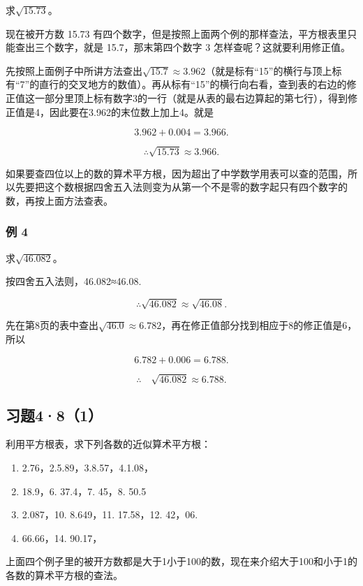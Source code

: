 求\(\sqrt{15.73}\)。

现在被开方数 15.73
有四个数字，但是按照上面两个例的那样查法，平方根表里只能查出三个数字，就是
15.7，那末第四个数字 3 怎样查呢？这就要利用修正值。

先按照上面例子中所讲方法查出\(\sqrt{15.7} \approx 3.962\)（就是标有``15''的横行与顶上标有``7''的直行的交叉地方的数值）。再从标有``15''的横行向右看，查到表的右边的修正值这一部分里顶上标有数字3的一行（就是从表的最右边算起的第七行），得到修正值是4，因此要在3.962的末位数上加上4。就是

\[
3.962 + 0.004 = 3.966.
\]

\[
\therefore \sqrt {15.73} \approx 3.966.
\]

如果要查四位以上的数的算术平方根，因为超出了中学数学用表可以查的范围，所以先要把这个数根据四舍五入法则变为从第一个不是零的数字起只有四个数字的数，再按上面方法查表。

\subsubsection{例 4}

求\(\sqrt{46.082}\)。

 按四舍五入法则，46.082≈46.08.

\[
\therefore \sqrt {46.082} \approx \sqrt {46.08}.
\]

先在第8页的表中查出\(\sqrt{46.0} \approx 6.782\)，再在修正值部分找到相应于8的修正值是6，所以

\[
6.782 + 0.006 = 6.788.
\]

\[
\therefore \quad \sqrt {46.082} \approx 6.788.
\]

\subsection{习题4·8（1）}

利用平方根表，求下列各数的近似算术平方根：

\begin{enumerate}
\item
  2.76，2.5.89，3.8.57，4.1.08，
\item
  18.9，6. 37.4，7. 45，8. 50.5
\item
  2.087，10. 8.649，11. 17.58，12. 42，06.
\item
  66.66，14. 90.17，
\end{enumerate}

上面四个例子里的被开方数都是大于1小于100的数，现在来介绍大于100和小于1的各数的算术平方根的查法。

